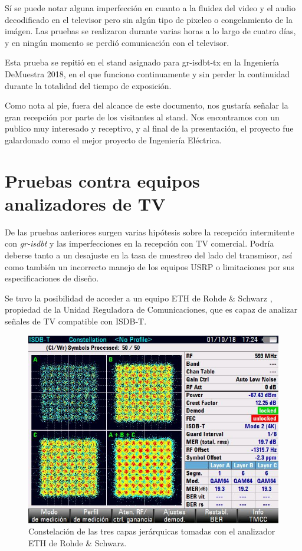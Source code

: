 Sí se puede notar alguna imperfección en cuanto a la fluidez del video y el audio decodificado en el televisor pero sin algún tipo de pixeleo o congelamiento de la imágen. Las pruebas se realizaron durante varias horas a lo largo de cuatro días, y en ningún momento se perdió comunicación con el televisor.

Esta prueba se repitió en el stand asignado para gr-isdbt-tx en la Ingeniería DeMuestra 2018, en el que funciono continuamente y sin perder la continuidad durante la totalidad del tiempo de exposición. 

Como nota al pie, fuera del alcance de este documento, nos gustaría señalar la gran recepción por parte de los visitantes al stand. Nos encontramos con un publico muy interesado y receptivo, y al final de la presentación, el proyecto fue galardonado como el mejor proyecto de Ingeniería Eléctrica.

\section{Pruebas contra equipos analizadores de TV}

De las pruebas anteriores surgen varias hipótesis sobre la recepción intermitente con \textit{gr-isdbt} y las imperfecciones en la recepción con TV comercial. Podría deberse tanto a un desajuste en la tasa de muestreo del lado del transmisor, así como también un incorrecto manejo de los equipos USRP o limitaciones por sus especificaciones de diseño.

Se tuvo la posibilidad de acceder a un equipo ETH de Rohde \& Schwarz \cite{Rohde}, propiedad de la Unidad Reguladora de Comunicaciones, que es capaz de analizar señales de TV compatible con ISDB-T. 

\begin{figure}[!h]
	\centering
	\includegraphics[scale=0.6]{figuras/cap06/constelacion_eth}
	\caption{\label{f:calidad_imagen} Constelación de las tres capas jerárquicas tomadas con el analizador ETH de Rohde \& Schwarz.}
\end{figure}

